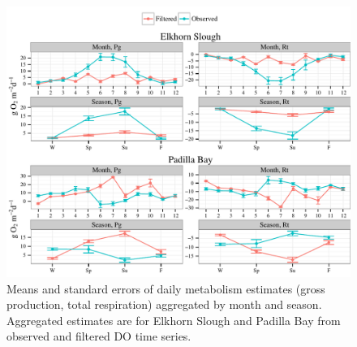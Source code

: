 \documentclass[letterpaper,12pt,oneside]{article}\usepackage[]{graphicx}\usepackage[]{color}
\makeatletter
\def\maxwidth{ %
  \ifdim\Gin@nat@width>\linewidth
    \linewidth
  \else
    \Gin@nat@width
  \fi
}
\newenvironment{knitrout}{}{} %
\makeatother
\begin{document}
\centering\vspace*{\fill}
\begin{knitrout}
\color{fgcolor}\begin{figure}[!ht]


{\centering \includegraphics[width=\maxwidth]{figure/metab_sum1} 

}

\caption[Means and standard errors of daily metabolism estimates (gross production, total respiration) aggregated by month and season]{Means and standard errors of daily metabolism estimates (gross production, total respiration) aggregated by month and season.  Aggregated estimates are for Elkhorn Slough and Padilla Bay from observed and filtered \ac{DO} time series.\label{fig:metab_sum1}}
\end{figure}


\end{knitrout}
\vfill
\clearpage
\end{document}
